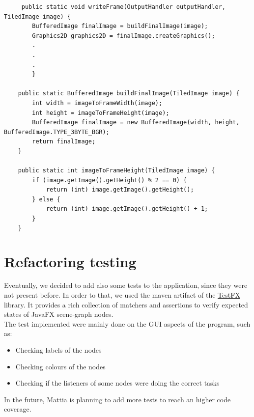 \documentclass{article}
\begin{document}
\begin{minipage}{0.5 \textwidth}
\begin{lstlisting}
     public static void writeFrame(OutputHandler outputHandler, TiledImage image) {
        BufferedImage finalImage = buildFinalImage(image);
        Graphics2D graphics2D = finalImage.createGraphics();
        .
        .
        .
        }
        
    public static BufferedImage buildFinalImage(TiledImage image) {
        int width = imageToFrameWidth(image);
        int height = imageToFrameHeight(image);
        BufferedImage finalImage = new BufferedImage(width, height, BufferedImage.TYPE_3BYTE_BGR);
        return finalImage;
    }
    
    public static int imageToFrameHeight(TiledImage image) {
        if (image.getImage().getHeight() % 2 == 0) {
            return (int) image.getImage().getHeight();
        } else {
            return (int) image.getImage().getHeight() + 1;
        }
    }
\end{lstlisting}
\end{minipage}


\section{Refactoring testing} 
Eventually, we decided to add also some tests to the application, since they were not present before. In order to that, we used the maven artifact of the \href{https://github.com/TestFX/TestFX}{TestFX} library. It provides a rich collection of matchers and assertions to verify expected states of JavaFX scene-graph nodes. \\
The test implemented were mainly done on the GUI aspects of the program, such as:

\begin{itemize}
    \item Checking labels of the nodes
    \item Checking colours of the nodes
    \item Checking if the listeners of some nodes were doing the correct tasks
\end{itemize}
In the future, Mattia is planning to add more tests to reach an higher code coverage.
\end{document}
